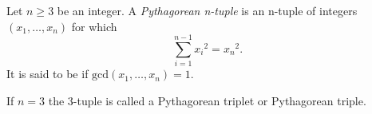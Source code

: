 \documentclass[12pt]{article}
\begin{document}
Let $n \ge 3$ be an integer. A \emph{Pythagorean n-tuple} is an n-tuple of integers $(x_1, \ldots, x_n)$
for which 
$$
\sum_{i=1}^{n-1} {x_i}^2 = {x_n}^2 .
$$
It is said to be  if $\mathrm{gcd}(x_1, \ldots, x_n) = 1.$

If $n=3$ the 3-tuple is called a Pythagorean triplet or Pythagorean triple.

\end{document}
